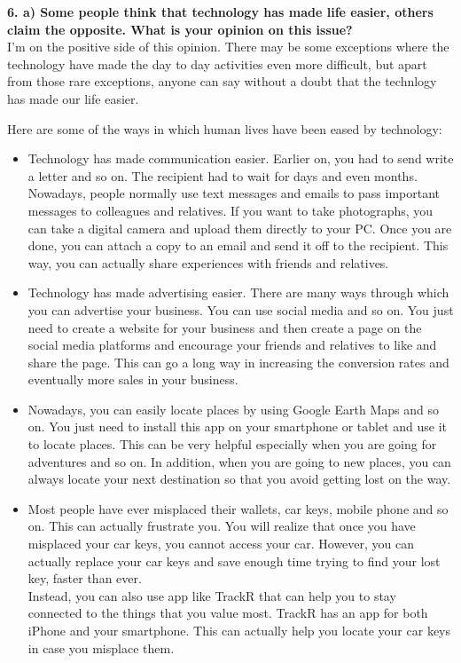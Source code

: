 \documentclass [12pt, a4paper]{article}
\begin{document}
\large
\textbf{6. a) Some people think that technology has made life easier, others claim the opposite. What is your opinion on this issue?}\\
\normalsize
I'm on the positive side of this opinion. There may be some exceptions where the technology have made the day to day activities even more difficult, but apart from those rare exceptions, anyone can say without a doubt that the technlogy has made our life easier.\\
\par
Here are some of the ways in which human lives have been eased by technology:

\begin{itemize}

\item Technology has made communication easier. Earlier on, you had to send write a letter and so on. The recipient had to wait for days and even months. Nowadays, people normally use text messages and emails to pass important messages to colleagues and relatives. If you want to take photographs, you can take a digital camera and upload them directly to your PC. Once you are done, you can attach a copy to an email and send it off to the recipient. This way, you can actually share experiences with friends and relatives.

\item Technology has made advertising easier. There are many ways through which you can advertise your business. You can use social media and so on. You just need to create a website for your business and then create a page on the social media platforms and encourage your friends and relatives to like and share the page. This can go a long way in increasing the conversion rates and eventually more sales in your business.

\item Nowadays, you can easily locate places by using Google Earth Maps and so on. You just need to install this app on your smartphone or tablet and use it to locate places. This can be very helpful especially when you are going for adventures and so on. In addition, when you are going to new places, you can always locate your next destination so that you avoid getting lost on the way.

\item Most people have ever misplaced their wallets, car keys, mobile phone and so on. This can actually frustrate you. You will realize that once you have misplaced your car keys, you cannot access your car. However, you can actually replace your car keys and save enough time trying to find your lost key, faster than ever.\\
Instead, you can also use app like TrackR that can help you to stay connected to the things that you value most. TrackR has an app for both iPhone and your smartphone. This can actually help you locate your car keys in case you misplace them.


\end{itemize}
\end{document}
